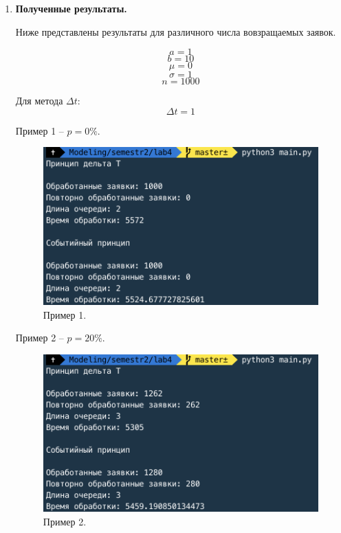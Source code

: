 \documentclass[a4paper,14pt]{extreport} %
\begin{document}
\begin{enumerate}
\item \textbf{Полученные результаты. }

Ниже представлены результаты для различного числа вовзращаемых заявок. 

$$a=1$$
$$b=10$$
$$\mu=0$$
$$\sigma=1$$
$$n=1000$$

Для метода $\Delta t$:
$$\Delta t=1$$

Пример 1 -- $p=0\%$.  
\begin{figure}[H]
  \centering
  \caption{Пример 1. }
  \includegraphics[scale=0.7]{1}
\end{figure}

Пример 2 -- $p=20\%$.  
\begin{figure}[H]
  \centering
  \caption{Пример 2. }
  \includegraphics[scale=0.7]{2}
\end{figure}

\newpage


\end{enumerate}
\end{document}
